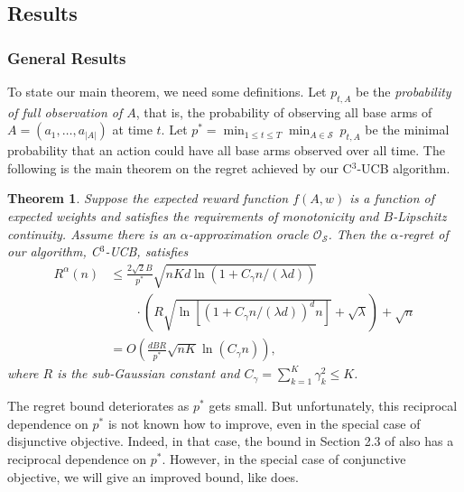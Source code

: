 \documentclass{article}
\newcommand{\cO}{\mathcal{O}}
\newcommand{\cS}{\mathcal{S}}
\newcommand{\abs}[1]{\left| #1 \right|}
\newtheorem{theorem}{Theorem}[section]
\begin{document}
\subsection{Results}

\subsubsection{General Results}

To state our main theorem, we need some definitions. Let $p_{t, A}$ be the {\em probability of full observation of $A$}, that is, the probability of observing all base arms of $A = (a_1, \ldots, a_{\abs{A}})$ at time $t$. Let $p^* = \min_{1 \leq t \leq T} \min_{A \in \cS} ~ p_{t, A}$ be the minimal probability that an action could have all base arms observed over all time. The following is the main theorem on the regret achieved by our C$^3$-UCB algorithm.

\begin{theorem} %
	\label{thm:main}
	Suppose the expected reward function $f(A, w)$ is a function of expected weights and satisfies the requirements of monotonicity and $B$-Lipschitz continuity. Assume there is an $\alpha$-approximation oracle $\cO_{\cS}$. Then the $\alpha$-regret of our algorithm, C$^3$-UCB, satisfies
	\begin{align}
		R^{\alpha}(n) &\le \frac{2\sqrt{2}B}{p^*} \sqrt{nKd\ln(1 + C_\gamma n/(\lambda d))}  \nonumber \\
		&\qquad \cdot \left(R\sqrt{\ln \left[(1 + C_\gamma n/(\lambda d))^d n \right] } + \sqrt{\lambda}\right) + \sqrt{n}\nonumber \\
		&=O\left(\frac{dBR}{p^*} \sqrt{nK} \ln(C_\gamma n) \right),
	\end{align}
	where $R$ is the sub-Gaussian constant and $C_{\gamma} = \sum_{k=1}^K \gamma_k^2 \leq K$.
\end{theorem}
The regret bound deteriorates as $p^*$ gets small. But unfortunately, this reciprocal dependence on $p^*$ is not known how to improve, even in the special case of disjunctive objective. Indeed, in that case, the bound in Section 2.3 of \cite{kveton2015combinatorial} also has a reciprocal dependence on $p^*$. However, in the special case of conjunctive objective, we will give an improved bound, like \cite{kveton2015combinatorial} does.
\end{document}
